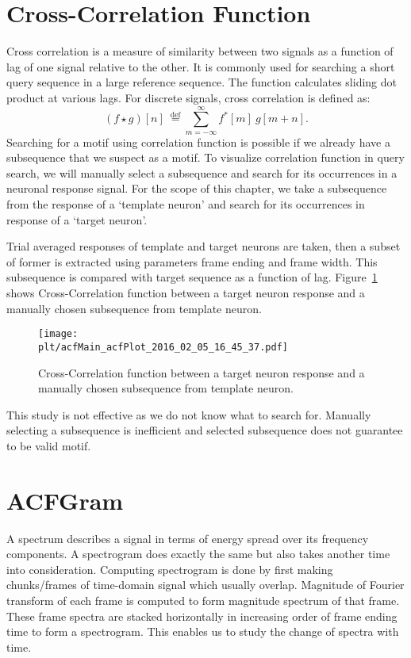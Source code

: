 \documentclass[MTech]{iitmdiss}
\newcommand{\plt}{thesis_plots}
\begin{document}
\section{Cross-Correlation Function} %
\label{sec:correlation_function}
Cross correlation is a measure of similarity between two signals as a function of lag of one signal relative to the other. It is commonly used for searching a short query sequence in a large reference sequence. The function calculates sliding dot product at various lags. For discrete signals, cross correlation is defined as:
$$(f \star g)[n]\ \stackrel{\mathrm{def}}{=} \sum_{m=-\infty}^{\infty} f^*[m]\ g[m+n].$$
Searching for a motif using correlation function  is possible if we already have a subsequence that we suspect as a motif. To visualize correlation function in query search, we will manually select a subsequence and search for its occurrences in a neuronal response signal. For the scope of this chapter, we take a subsequence from the response of a `template neuron' and search for its occurrences in response of a `target neuron'.

Trial averaged responses of template and target neurons are taken, then a subset of former is extracted using parameters frame ending and frame width. This subsequence is compared with target sequence as a function of lag. Figure~\ref{img:cacf} shows Cross-Correlation function between a target neuron response and a manually chosen subsequence from template neuron.
\begin{figure}[h]
    \centering
    \texttt{[image: \\plt/acfMain\_acfPlot\_2016\_02\_05\_16\_45\_37.pdf]}
    \caption{Cross-Correlation function between a target neuron response and a manually chosen subsequence from template neuron.}
    \label{img:cacf}
\end{figure}
This study is not effective as we do not know what to search for. Manually selecting a subsequence is inefficient and selected subsequence does not guarantee to be valid motif. 
\section{ACFGram} %
\label{sec:acfgram}
A spectrum describes a signal in terms of energy spread over its frequency components. A spectrogram does exactly the same but also takes  another time into consideration. Computing spectrogram is done by first making chunks/frames of time-domain signal which usually overlap. Magnitude of Fourier transform of each frame is computed to form magnitude spectrum of that frame. These frame spectra are stacked horizontally in increasing order of frame ending time to form a spectrogram. This enables us to study the change of spectra with time.
\end{document}
